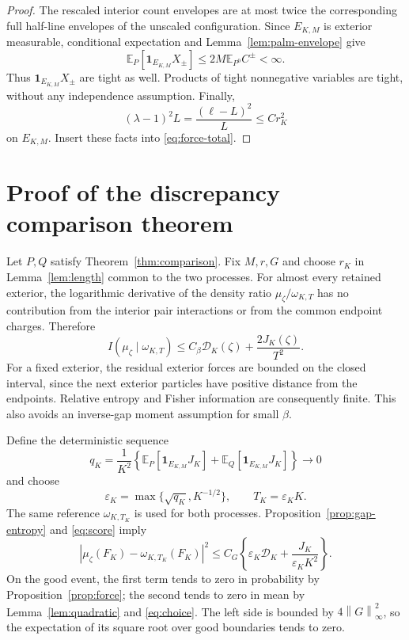 \documentclass[11pt,reqno]{amsart}
\numberwithin{equation}{section}
\theoremstyle{definition}
\theoremstyle{remark}
\newcommand{\E}{\mathbb E}
\newcommand{\1}{\mathbf 1}
\newcommand{\norm}[1]{\left\lVert #1\right\rVert}
\begin{document}
\begin{proof}
The rescaled interior count envelopes are at most twice the corresponding
full half-line envelopes of the unscaled configuration. Since
$E_{K,M}$ is exterior measurable, conditional expectation and
Lemma~\ref{lem:palm-envelope} give
\[
\E_P[\1_{E_{K,M}}X_\pm]\le
2M\E_{P^0}C^\pm<\infty.
\]
Thus $\1_{E_{K,M}}X_\pm$ are tight as well. Products of tight
nonnegative variables are tight, without any independence assumption.
Finally,
\[
(\lambda-1)^2L=\frac{(\ell-L)^2}{L}\le Cr_K^2
\]
on $E_{K,M}$. Insert these facts into \eqref{eq:force-total}.
\end{proof}

\section{Proof of the discrepancy comparison theorem}
\label{sec:proof-main}

Let $P,Q$ satisfy Theorem~\ref{thm:comparison}. Fix $M,r,G$ and choose
$r_K$ in Lemma~\ref{lem:length} common to the two processes.
For almost every retained exterior, the logarithmic derivative of the density
ratio $\mu_\zeta/\omega_{K,T}$ has no contribution from the interior
pair interactions or from the common endpoint charges. Therefore
\begin{equation}\label{eq:score}
I(\mu_\zeta\mid\omega_{K,T})
\le C_\beta\mathcal D_K(\zeta)+\frac{2J_K(\zeta)}{T^2}.
\end{equation}
For a fixed exterior, the residual exterior forces are bounded on the
closed interval, since the next exterior particles have positive
distance from the endpoints. Relative entropy and Fisher information
are consequently finite. This also avoids an inverse-gap moment
assumption for small $\beta$.

Define the deterministic sequence
\[
q_K=\frac1{K^2}\left\{
\E_P[\1_{E_{K,M}}J_K]+\E_Q[\1_{E_{K,M}}J_K]\right\}\longrightarrow0
\]
and choose
\begin{equation}\label{eq:choice}
\varepsilon_K=\max\{\sqrt{q_K},K^{-1/2}\},
\qquad T_K=\varepsilon_KK.
\end{equation}
The same reference $\omega_{K,T_K}$ is used for both processes.
Proposition~\ref{prop:gap-entropy} and \eqref{eq:score} imply
\begin{equation}\label{eq:comparison-final}
|\mu_\zeta(F_K)-\omega_{K,T_K}(F_K)|^2
\le C_G\left\{\varepsilon_K\mathcal D_K
                 +\frac{J_K}{\varepsilon_KK^2}\right\}.
\end{equation}
On the good event, the first term tends to zero in probability by
Proposition~\ref{prop:force}; the second tends to zero in mean by
Lemma~\ref{lem:quadratic} and \eqref{eq:choice}. The left side is
bounded by $4\norm G_\infty^2$, so the expectation of its square root
over good boundaries tends to zero.
\end{document}
